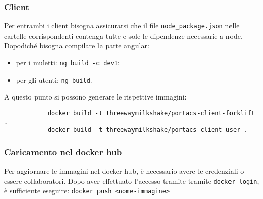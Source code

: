     \subsubsection{Client}
        Per entrambi i client bisogna assicurarsi che il file \texttt{node\_package.json} nelle cartelle corrispondenti contenga tutte e sole le dipendenze necessarie a node. Dopodiché bisogna compilare la parte angular:
        \begin{itemize}
            \item per i muletti: \texttt{ng build -c dev1};
            \item per gli utenti: \texttt{ng build}.
        \end{itemize}
        A questo punto si possono generare le rispettive immagini:
        \begin{verbatim}
            docker build -t threewaymilkshake/portacs-client-forklift .
            docker build -t threewaymilkshake/portacs-client-user .
        \end{verbatim}


    \subsubsection{Caricamento nel docker hub}
        \noindent Per aggiornare le immagini nel docker hub, è necessario avere le credenziali o essere collaboratori. Dopo aver effettuato l'accesso tramite tramite \texttt{docker login}, è sufficiente eseguire: \texttt{docker push <nome-immagine>}












